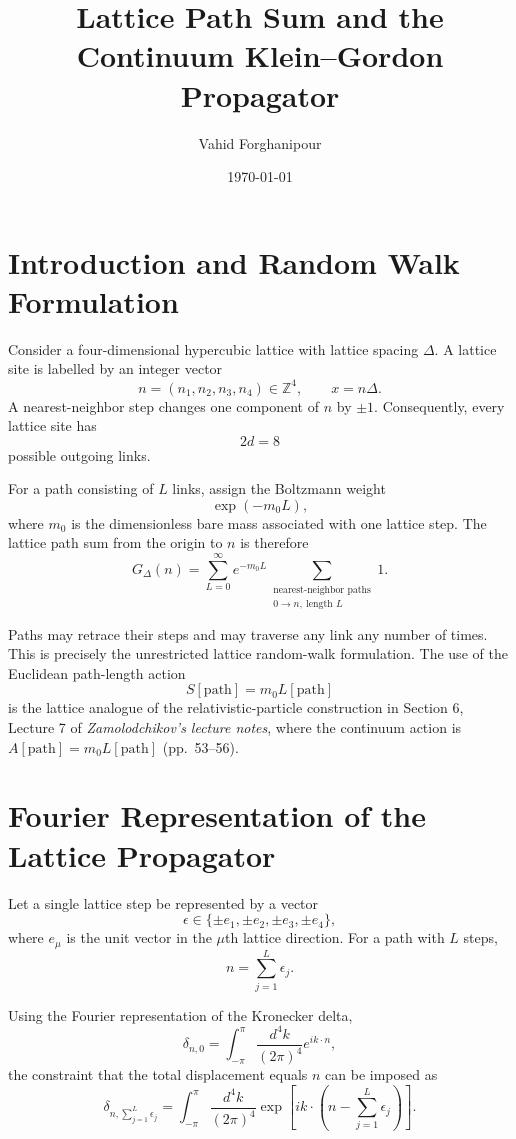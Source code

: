 \documentclass[11pt]{article}
\title{Lattice Path Sum and the Continuum Klein--Gordon Propagator}
\author{Vahid Forghanipour}
\date{\today}
\begin{document}
	
	\maketitle
	
	\section{Introduction and Random Walk Formulation}
	
	Consider a four-dimensional hypercubic lattice with lattice spacing
	$\Delta$. A lattice site is labelled by an integer vector
	\[
	n=(n_1,n_2,n_3,n_4)\in\mathbb{Z}^4,
	\qquad
	x=n\Delta .
	\]
	A nearest-neighbor step changes one component of $n$ by $\pm1$.
	Consequently, every lattice site has
	\[
	2d=8
	\]
	possible outgoing links.
	
	For a path consisting of $L$ links, assign the Boltzmann weight
	\[
	\exp(-m_0 L),
	\]
	where $m_0$ is the dimensionless bare mass associated with one lattice
	step. The lattice path sum from the origin to $n$ is therefore
	\[
	G_\Delta(n)
	=
	\sum_{L=0}^{\infty}e^{-m_0L}
	\sum_{\substack{\text{nearest-neighbor paths}\\
			0\to n,\ \text{length }L}}1.
	\]
	
	Paths may retrace their steps and may traverse any link any number of
	times. This is precisely the unrestricted lattice random-walk
	formulation. The use of the Euclidean path-length action
	\[
	S[\text{path}]=m_0 L[\text{path}]
	\]
	is the lattice analogue of the relativistic-particle construction in
	Section 6, Lecture 7 of
	\emph{Zamolodchikov’s lecture notes}, where the continuum action is
	$A[\text{path}]=m_0L[\text{path}]$ (pp.~53--56).
	
	\section{Fourier Representation of the Lattice Propagator}
	
	Let a single lattice step be represented by a vector
	\[
	\epsilon\in\{\pm e_1,\pm e_2,\pm e_3,\pm e_4\},
	\]
	where $e_\mu$ is the unit vector in the $\mu$th lattice direction. For
	a path with $L$ steps,
	\[
	n=\sum_{j=1}^{L}\epsilon_j .
	\]
	
	Using the Fourier representation of the Kronecker delta,
	\[
	\delta_{n,0}
	=
	\int_{-\pi}^{\pi}
	\frac{d^4k}{(2\pi)^4}
	e^{ik\cdot n},
	\]
	the constraint that the total displacement equals $n$ can be imposed as
	\[
	\delta_{n,\sum_{j=1}^{L}\epsilon_j}
	=
	\int_{-\pi}^{\pi}
	\frac{d^4k}{(2\pi)^4}
	\exp\left[
	ik\cdot
	\left(
	n-\sum_{j=1}^{L}\epsilon_j
	\right)
	\right].
	\]
	
\end{document}
